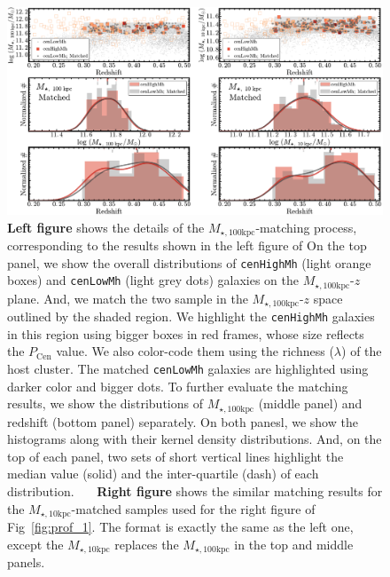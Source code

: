 \documentclass[a4paper,fleqn,usenatbib]{mnras}
\def\rbcg{\texttt{cenHighMh}}
\def\nbcg{\texttt{cenLowMh}}
\def\minn{{$M_{\star,10\mathrm{kpc}}$}}
\def\mtot{{$M_{\star,100\mathrm{kpc}}$}}
\begin{document}
\begin{figure}
    \centering 
    \includegraphics[width=15.0cm]{fig/redbcg_match}
    \caption{
        \textbf{Left figure} shows the details of the \mtot{}-matching process, 
        corresponding to the results shown in the left figure of   
        On the top panel, we show the overall distributions of \rbcg{} (light orange boxes) 
        and \nbcg{} (light grey dots) galaxies on the \mtot{}-$z$ plane.  
        And, we match the two sample in the \mtot{}-$z$ space outlined by the shaded region.
        We highlight the \rbcg{} galaxies in this region using bigger boxes in red frames, 
        whose size reflects the $P_{\mathrm{Cen}}$ value.  
        We also color-code them using the richness ($\lambda$) of the host cluster. 
        The matched \nbcg{} galaxies are highlighted using darker color and bigger dots. 
        To further evaluate the matching results, we show the distributions of \mtot{} 
        (middle panel) and redshift (bottom panel) separately. 
        On both panesl, we show the histograms along with their kernel density 
        distributions.  
        And, on the top of each panel, two sets of short vertical lines highlight the median 
        value (solid) and the inter-quartile (dash) of each distribution.~~~
        \textbf{Right figure} shows the similar matching results for the \minn{}-matched
        samples used for the right figure of Fig~\ref{fig:prof_1}.
        The format is exactly the same as the left one, except the \minn{} replaces the 
        \mtot{} in the top and middle panels.}
    \label{fig:match}
\end{figure}
\end{document}

